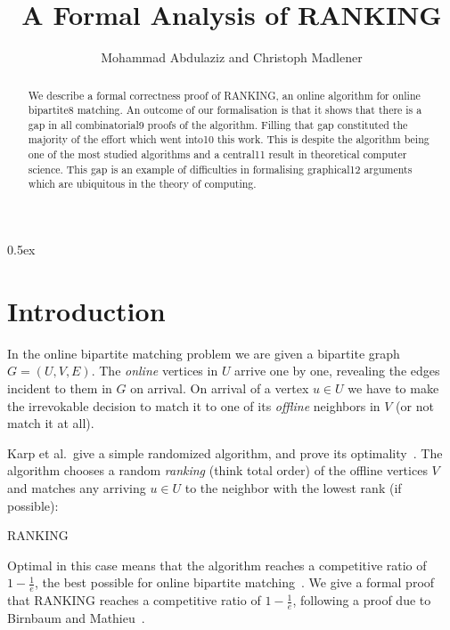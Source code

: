 \documentclass[11pt,a4paper]{article}
\begin{document}
\title{A Formal Analysis of RANKING}
\author{Mohammad Abdulaziz and Christoph Madlener}
\maketitle

\begin{abstract}
We describe a formal correctness proof of RANKING, an online algorithm for online bipartite8
matching. An outcome of our formalisation is that it shows that there is a gap in all combinatorial9
proofs of the algorithm. Filling that gap constituted the majority of the effort which went into10
this work. This is despite the algorithm being one of the most studied algorithms and a central11
result in theoretical computer science. This gap is an example of difficulties in formalising graphical12
arguments which are ubiquitous in the theory of computing.
\end{abstract}

\tableofcontents

\parindent 0pt\parskip 0.5ex

\section{Introduction}
In the online bipartite matching problem we are given a bipartite graph $G=(U,V,E)$. The \emph{online}
vertices in $U$ arrive one by one, revealing the edges incident to them in $G$ on arrival. On
arrival of a vertex $u \in U$ we have to make the irrevokable decision to match it to one of
its \emph{offline} neighbors in $V$ (or not match it at all).

Karp et al.\ give a simple randomized algorithm, and prove its optimality~\cite{karp1990}. The
algorithm chooses a random \emph{ranking} (think total order) of the offline vertices $V$ and
matches any arriving $u \in U$ to the neighbor with the lowest rank (if possible):

\begin{algorithm}[H]
\DontPrintSemicolon
\caption{RANKING}\label{alg:ranking}
\Online{}
\end{algorithm}

Optimal in this case means that the algorithm reaches a competitive ratio of $1 - \frac{1}{e}$,
the best possible for online bipartite matching~\cite{karp1990}.
We give a formal proof that RANKING reaches a competitive ratio of $1-\frac{1}{e}$,
 following a proof due to Birnbaum and Mathieu~\cite{birnbaum2008}.
\end{document}
